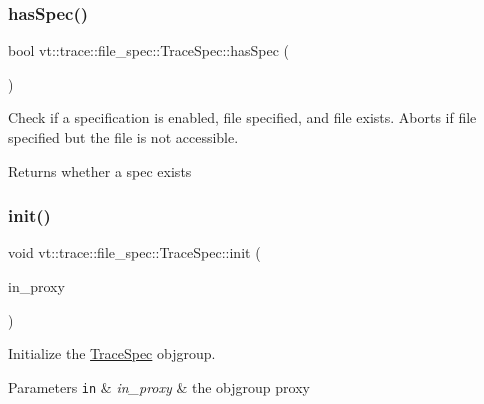 \subsubsection{\texorpdfstring{has\+Spec()}{hasSpec()}}
{\footnotesize\ttfamily bool vt\+::trace\+::file\+\_\+spec\+::\+Trace\+Spec\+::has\+Spec (\begin{DoxyParamCaption}{ }\end{DoxyParamCaption})}



Check if a specification is enabled, file specified, and file exists. Aborts if file specified but the file is not accessible. 

\begin{DoxyReturn}{Returns}
whether a spec exists 
\end{DoxyReturn}
\mbox{\label{structvt_1_1trace_1_1file__spec_1_1_trace_spec_aa919658e5981872e86e4aa2ed1186f46}} 
\subsubsection{\texorpdfstring{init()}{init()}}
{\footnotesize\ttfamily void vt\+::trace\+::file\+\_\+spec\+::\+Trace\+Spec\+::init (\begin{DoxyParamCaption}\item[{\hyperlink{structvt_1_1trace_1_1file__spec_1_1_trace_spec_a26160cff9bb5115866943ed823405f1f}{Proxy\+Type}}]{in\+\_\+proxy }\end{DoxyParamCaption})\hspace{0.3cm}{\ttfamily [private]}}



Initialize the {\ttfamily \hyperlink{structvt_1_1trace_1_1file__spec_1_1_trace_spec}{Trace\+Spec}} objgroup. 


\begin{DoxyParams}[1]{Parameters}
\mbox{\tt in}  & {\em in\+\_\+proxy} & the objgroup proxy \\
\hline
\end{DoxyParams}
\mbox{\label{structvt_1_1trace_1_1file__spec_1_1_trace_spec_af9bbdd67b14a25bee5ffa43024c9768c}} 

